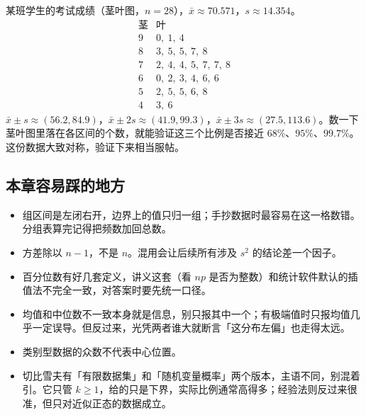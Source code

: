 \begin{example}[期末成绩]
某班学生的考试成绩（茎叶图，$n=28$），$\bar x\approx70.571$，$s\approx14.354$。
\[
\begin{array}{c|l}
\text{茎} & \text{叶}\\ \hline
9 & 0,\ 1,\ 4\\
8 & 3,\ 5,\ 5,\ 7,\ 8\\
7 & 2,\ 4,\ 4,\ 5,\ 7,\ 7,\ 8\\
6 & 0,\ 2,\ 3,\ 4,\ 6,\ 6\\
5 & 2,\ 5,\ 5,\ 6,\ 8\\
4 & 3,\ 6
\end{array}
\]
$\bar x\pm s\approx(56.2,84.9)$，$\bar x\pm2s\approx(41.9,99.3)$，$\bar x\pm3s\approx(27.5,113.6)$。数一下茎叶图里落在各区间的个数，就能验证这三个比例是否接近 $68\%$、$95\%$、$99.7\%$。这份数据大致对称，验证下来相当服帖。
\end{example}

\subsection*{本章容易踩的地方}

\begin{itemize}
 \item 组区间是左闭右开，边界上的值只归一组；手抄数据时最容易在这一格数错。分组表算完记得把频数加回总数。
 \item 方差除以 $n-1$，不是 $n$。混用会让后续所有涉及 $s^2$ 的结论差一个因子。
 \item 百分位数有好几套定义，讲义这套（看 $np$ 是否为整数）和统计软件默认的插值法不完全一致，对答案时要先统一口径。
 \item 均值和中位数不一致本身就是信息，别只报其中一个；有极端值时只报均值几乎一定误导。但反过来，光凭两者谁大就断言「这分布左偏」也走得太远。
 \item 类别型数据的众数不代表中心位置。
 \item 切比雪夫有「有限数据集」和「随机变量概率」两个版本，主语不同，别混着引。它只管 $k\ge1$，给的只是下界，实际比例通常高得多；经验法则反过来很准，但只对近似正态的数据成立。
\end{itemize}
